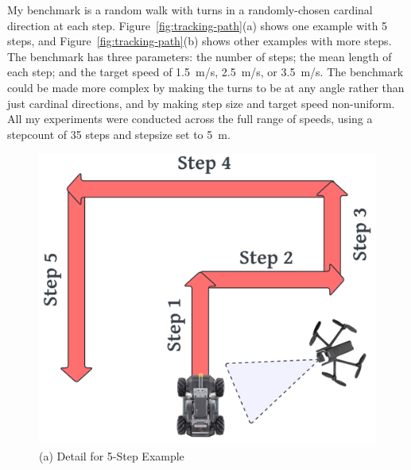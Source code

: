 My benchmark is a random walk with turns in a randomly-chosen
cardinal direction at each step.  Figure~\ref{fig:tracking-path}(a)
shows one example with 5 steps, and Figure~\ref{fig:tracking-path}(b)
shows other examples with more steps.  The benchmark has three
parameters: the number of steps;  the mean length of each step;
and the target speed of 1.5~m/s, 2.5~m/s, or 3.5~m/s.  The
benchmark could be made more complex by making the turns to be at any
angle rather than just cardinal directions, and by making step size
and target speed non-uniform.  All my experiments were conducted
across the full range of speeds, using a stepcount of 35 steps
and stepsize  set to 5~m.

\begin{figure}
\centering
\begin{minipage}{0.6\linewidth}
\centering
\includegraphics[width=0.8\linewidth]{chapter6/FIGS/fig-tracking-onepath.png}\\
{(a) Detail for 5-Step Example}
\end{minipage}
\begin{minipage}{0.35\linewidth}
\centering

\end{minipage}
\end{figure}
